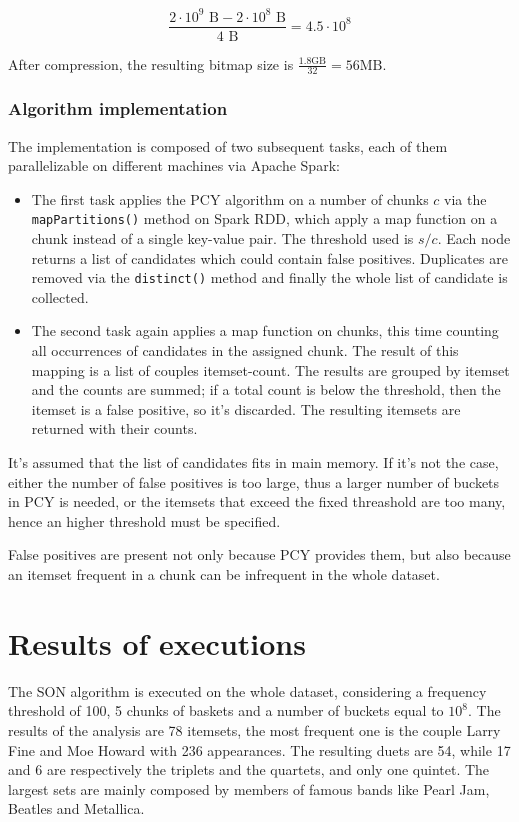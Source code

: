 \documentclass{article}
\begin{document}
\begin{equation}
	\frac{2 \cdot 10^9 \text{ B} - 2 \cdot 10^8 \text{ B}}{4 \text{ B}} = 4.5 \cdot 10^8
\end{equation}

After compression, the resulting bitmap size is $\frac{1.8 \text{GB} }{32} = 56 \text{MB}$.

\subsubsection{Algorithm implementation}

The implementation is composed of two subsequent tasks, each of them parallelizable on different machines via Apache Spark:
\begin{itemize}
	\item The first task applies the PCY algorithm on a number of chunks $c$ via the \texttt{mapPartitions()} method on Spark RDD, which apply a map function on a chunk instead of a single key-value pair. The threshold used is $s/c$. Each node returns a list of candidates which could contain false positives. Duplicates are removed via the \texttt{distinct()} method and finally the whole list of candidate is collected.
	\item The second task again applies a map function on chunks, this time counting all occurrences of candidates in the assigned chunk. The result of this mapping is a list of couples itemset-count.  The results are grouped by itemset and the counts are summed; if a total count is below the threshold, then the itemset is a false positive, so it's discarded. The resulting itemsets are returned with their counts.
\end{itemize}

It's assumed that the list of candidates fits in main memory. If it's not the case, either the number of false positives is too large, thus a larger number of buckets in PCY is needed, or the itemsets that exceed the fixed threashold are too many, hence an higher threshold must be specified.

False positives are present not only because PCY provides them, but also because an itemset frequent in a chunk can be infrequent in the whole dataset. 

\section{Results of executions}

The SON algorithm is executed on the whole dataset, considering a frequency threshold of 100, 5 chunks of baskets and a number of buckets equal to $10^8$.
The results of the analysis are 78 itemsets, the most frequent one is the couple Larry Fine and Moe Howard with 236 appearances. The resulting duets are 54, while 17 and 6 are respectively the triplets and the quartets, and only one quintet. The largest sets are mainly composed by members of famous bands like Pearl Jam, Beatles and Metallica.
\end{document}
